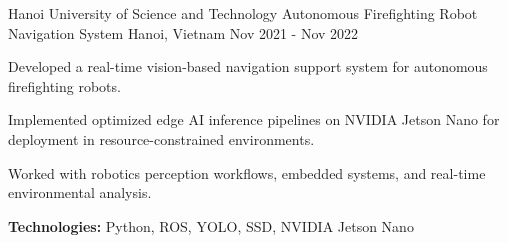 

\begin{cventries}

  \cventry
    {Hanoi University of Science and Technology}
    {Autonomous Firefighting Robot Navigation System}
    {Hanoi, Vietnam}
    {Nov 2021 - Nov 2022}
    {
      \begin{cvitems}
        \item {Developed a real-time vision-based navigation support system for autonomous firefighting robots.}
        \item {Implemented optimized edge AI inference pipelines on NVIDIA Jetson Nano for deployment in resource-constrained environments.}
        \item {Worked with robotics perception workflows, embedded systems, and real-time environmental analysis.}
        \item {\textbf{Technologies:} Python, ROS, YOLO, SSD, NVIDIA Jetson Nano}
      \end{cvitems}
    }


\end{cventries}
